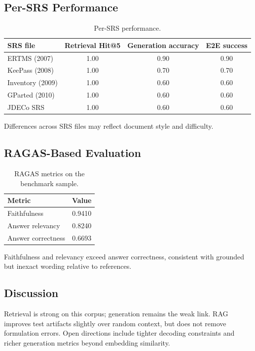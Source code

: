 \documentclass[conference]{IEEEtran}
\begin{document}
\subsection{Per-SRS Performance}

\begin{table}[h]
\centering
\caption{Per-SRS performance.}
\label{tab:per_srs_results}
\begin{tabular}{lccc}
\hline
SRS file & Retrieval Hit@5 & Generation accuracy & E2E success \\
\hline
ERTMS (2007) & 1.00 & 0.90 & 0.90 \\
KeePass (2008) & 1.00 & 0.70 & 0.70 \\
Inventory (2009) & 1.00 & 0.60 & 0.60 \\
GParted (2010) & 1.00 & 0.60 & 0.60 \\
JDECo SRS & 1.00 & 0.60 & 0.60 \\
\hline
\end{tabular}
\end{table}

Differences across SRS files may reflect document style and difficulty.

\subsection{RAGAS-Based Evaluation}

\begin{table}[h]
\centering
\caption{RAGAS metrics on the benchmark sample.}
\label{tab:ragas}
\begin{tabular}{lc}
\hline
Metric & Value \\
\hline
Faithfulness & 0.9410 \\
Answer relevancy & 0.8240 \\
Answer correctness & 0.6693 \\
\hline
\end{tabular}
\end{table}

Faithfulness and relevancy exceed answer correctness, consistent with grounded but inexact wording relative to references.

\subsection{Discussion}

Retrieval is strong on this corpus; generation remains the weak link. RAG improves test artifacts slightly over random context, but does not remove formulation errors. Open directions include tighter decoding constraints and richer generation metrics beyond embedding similarity.
\end{document}
